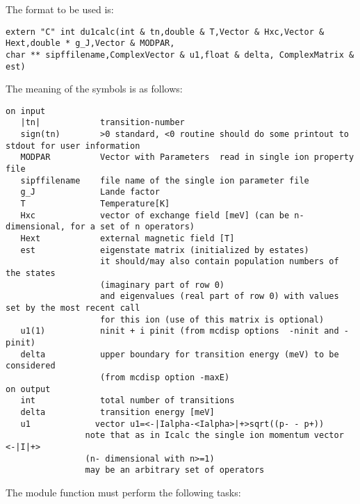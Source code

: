 The format to be used is:
{\footnotesize
\begin{verbatim}
extern "C" int du1calc(int & tn,double & T,Vector & Hxc,Vector & Hext,double * g_J,Vector & MODPAR,
char ** sipffilename,ComplexVector & u1,float & delta, ComplexMatrix & est)
\end{verbatim}

The meaning of the symbols is as follows:

\begin{verbatim}
on input
   |tn|            transition-number  
   sign(tn)        >0 standard, <0 routine should do some printout to stdout for user information
   MODPAR          Vector with Parameters  read in single ion property file
   sipffilename    file name of the single ion parameter file
   g_J             Lande factor
   T               Temperature[K]
   Hxc             vector of exchange field [meV] (can be n-dimensional, for a set of n operators)
   Hext            external magnetic field [T]
   est             eigenstate matrix (initialized by estates)
                   it should/may also contain population numbers of the states
				   (imaginary part of row 0)
                   and eigenvalues (real part of row 0) with values set by the most recent call
				   for this ion (use of this matrix is optional)
   u1(1)           ninit + i pinit (from mcdisp options  -ninit and -pinit)
   delta           upper boundary for transition energy (meV) to be considered
                   (from mcdisp option -maxE)
on output
   int             total number of transitions
   delta           transition energy [meV]
   u1             vector u1=<-|Ialpha-<Ialpha>|+>sqrt((p- - p+))                          
                note that as in Icalc the single ion momentum vector <-|I|+> 
				(n- dimensional with n>=1)
                may be an arbitrary set of operators
\end{verbatim}
}
The module function must perform the following tasks:
